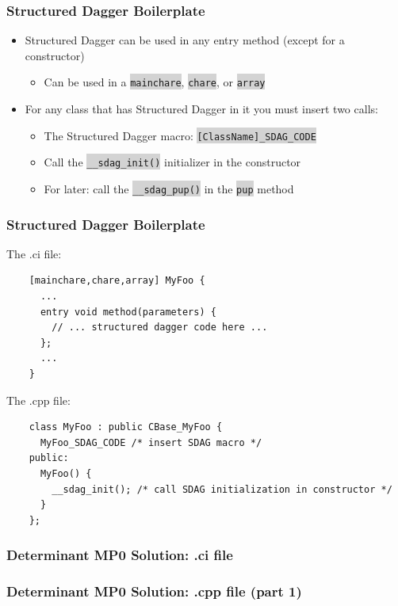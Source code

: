 \documentclass{beamer}
\newcommand{\code}[1]{\colorbox{lightgray}{\texttt{#1}}}
\begin{document}
\begin{frame}
  \frametitle{Structured Dagger Boilerplate}
  \begin{itemize}
    \item Structured Dagger can be used in any entry method (except for a constructor)
      \begin{itemize}
      \item Can be used in a \code{mainchare}, \code{chare}, or \code{array}
      \end{itemize}
    \item For any class that has Structured Dagger in it you must insert two
      calls:
       \begin{itemize}
         \item The Structured Dagger macro: \code{[ClassName]\_SDAG\_CODE}
         \item Call the \code{\_\_sdag\_init()} initializer in the constructor
         \item For later: call the \code{\_\_sdag\_pup()} in the \code{pup} method
       \end{itemize}
  \end{itemize}
\end{frame}

\begin{frame}[fragile]
  \frametitle{Structured Dagger Boilerplate}
  The .ci file:
  \begin{lstlisting}
    [mainchare,chare,array] MyFoo {
      ...
      entry void method(parameters) {
        // ... structured dagger code here ...
      };
      ...
    }
  \end{lstlisting}

  The .cpp file:
  \begin{lstlisting}
    class MyFoo : public CBase_MyFoo {
      MyFoo_SDAG_CODE /* insert SDAG macro */
    public:
      MyFoo() {
        __sdag_init(); /* call SDAG initialization in constructor */
      }
    };
  \end{lstlisting}
\end{frame}

\begin{frame}[fragile]
  \frametitle{Determinant MP0 Solution: .ci file}
  
\end{frame}

\begin{frame}[fragile]
  \frametitle{Determinant MP0 Solution: .cpp file (part 1)}
  
\end{frame}
\end{document}
